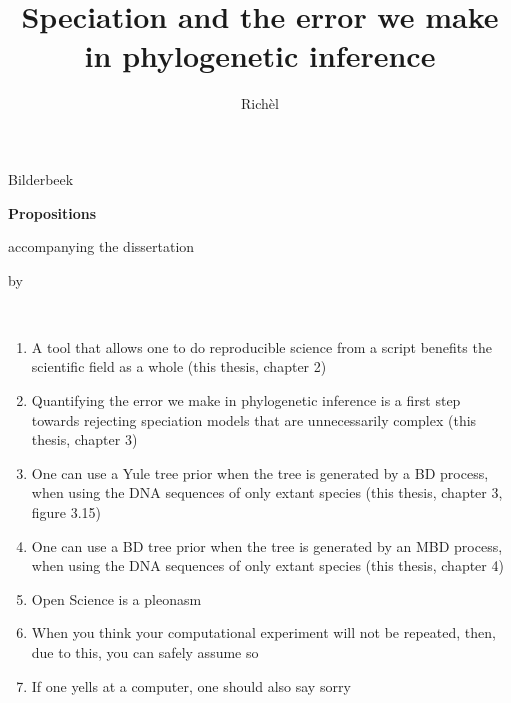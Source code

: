 \documentclass{propositions}
\begin{document}
\title{Speciation and the error we make in phylogenetic inference}
\author{Richèl}{Bilderbeek}

\begin{center}

{\Large\titlefont\bfseries Propositions}

\bigskip

accompanying the dissertation

\bigskip

{\makeatletter
\titlestyle\bfseries\large\@title
\makeatother}

{\makeatletter
\ifx\@subtitle\undefined\else
    \titlefont\titleshape\@subtitle
\fi
\makeatother}

\bigskip

by

\bigskip

\makeatletter
{\large\titlefont\bfseries\@firstname\ {\titleshape\@lastname}}
\makeatother

\end{center}

\bigskip
\bigskip

\begin{enumerate}
  \item A tool that allows one to do reproducible science from a script
        benefits the scientific field as a whole (this thesis, chapter 2)
  \item Quantifying the error we make in phylogenetic inference is
        a first step towards rejecting speciation models that are
        unnecessarily complex (this thesis, chapter 3)
  \item One can use a Yule tree prior when the tree
        is generated by a BD process, when using the DNA sequences
        of only extant species (this thesis, chapter 3, figure 3.15)
  \item One can use a BD tree prior when the tree
        is generated by an MBD process, when using the DNA sequences
        of only extant species (this thesis, chapter 4)
  \item Open Science is a pleonasm
  \item When you think your computational experiment will not be repeated,
        then, due to this, you can safely assume so
  \item If one yells at a computer, one should also say sorry
\end{enumerate}
\end{document}
